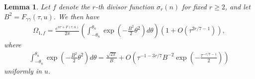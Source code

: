 \documentclass[12pt, oneside,reqno]{amsart}
\numberwithin{equation}{section}
\newtheorem{lemma}[theorem]{Lemma}
\begin{document}

\begin{lemma}\label{maintermforsigmar}
Let $f$ denote the $r$-th divisor function $\sigma_r(n)$ for fixed $r\geq 2$, and let $B^2=F_{\gamma\gamma}(\tau,u)$. We then have
\begin{align*}
\Omega_{1,f}
=\frac{e^{n\tau+F(\tau, u)}}{2\pi}\left(\int_{-\theta_n}^{\theta_n}\exp\left(-\frac{B^2}{2}\theta^2\right)d\theta\right)\left(1+O\left(\tau^{2r/7-1}\right)\right),
\end{align*}
where
\begin{align*}
\int_{-\theta_n}^{\theta_n}\exp\left(-\frac{B^2}{2}\theta^2\right)d\theta 
=\frac{\sqrt{2\pi}}{B}+O\left(\tau^{-1-3r/7}B^{-2}\exp\left(-\frac{\tau^{-r/7-1}}{2}\right)\right)
\end{align*}
uniformly in $u$. 
\end{lemma}
\end{document}
